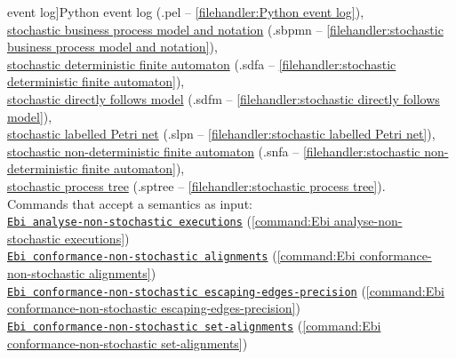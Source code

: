 {event log]{Python event log} (.pel -- \cref{filehandler:Python event log}), \\\null\qquad\hyperref[filehandler:stochastic business process model and notation]{stochastic business process model and notation} (.sbpmn -- \cref{filehandler:stochastic business process model and notation}), \\\null\qquad\hyperref[filehandler:stochastic deterministic finite automaton]{stochastic deterministic finite automaton} (.sdfa -- \cref{filehandler:stochastic deterministic finite automaton}), \\\null\qquad\hyperref[filehandler:stochastic directly follows model]{stochastic directly follows model} (.sdfm -- \cref{filehandler:stochastic directly follows model}), \\\null\qquad\hyperref[filehandler:stochastic labelled Petri net]{stochastic labelled Petri net} (.slpn -- \cref{filehandler:stochastic labelled Petri net}), \\\null\qquad\hyperref[filehandler:stochastic non-deterministic finite automaton]{stochastic non-deterministic finite automaton} (.snfa -- \cref{filehandler:stochastic non-deterministic finite automaton}), \\\null\qquad\hyperref[filehandler:stochastic process tree]{stochastic process tree} (.sptree -- \cref{filehandler:stochastic process tree}).
\\Commands that accept a semantics as input: \\\null\qquad\hyperref[command:Ebi analyse-non-stochastic executions]{\texttt{Ebi analyse-non-stochastic executions}} (\cref{command:Ebi analyse-non-stochastic executions})\\\null\qquad\hyperref[command:Ebi conformance-non-stochastic alignments]{\texttt{Ebi conformance-non-stochastic alignments}} (\cref{command:Ebi conformance-non-stochastic alignments})\\\null\qquad\hyperref[command:Ebi conformance-non-stochastic escaping-edges-precision]{\texttt{Ebi conformance-non-stochastic escaping-edges-precision}} (\cref{command:Ebi conformance-non-stochastic escaping-edges-precision})\\\null\qquad\hyperref[command:Ebi conformance-non-stochastic set-alignments]{\texttt{Ebi conformance-non-stochastic set-alignments}} (\cref{command:Ebi conformance-non-stochastic set-alignments})
}
